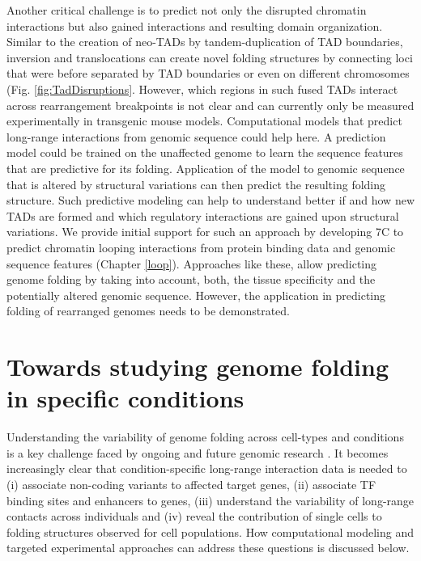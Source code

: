 \documentclass[a4paper,twoside=true,openright,parskip=full,chapterprefix=true,11pt,headings=normal,bibliography=totoc,listof=totoc,titlepage=on,captions=tableabove,draft=false]{scrreprt}
\theoremstyle{definition}
\theoremstyle{definition}
\theoremstyle{definition}
\theoremstyle{remark}
\begin{document}
Another critical challenge is to predict not only the disrupted
chromatin interactions but also gained interactions and resulting domain
organization. Similar to the creation of neo-TADs by tandem-duplication
of TAD boundaries, inversion and translocations can create novel folding
structures by connecting loci that were before separated by TAD
boundaries or even on different chromosomes (Fig.
\ref{fig:TadDisruptions}. However, which regions in such fused TADs
interact across rearrangement breakpoints is not clear and can currently
only be measured experimentally in transgenic mouse models.
Computational models that predict long-range interactions from genomic
sequence could help here. A prediction model could be trained on the
unaffected genome to learn the sequence features that are predictive for
its folding. Application of the model to genomic sequence that is
altered by structural variations can then predict the resulting folding
structure. Such predictive modeling can help to understand better if and
how new TADs are formed and which regulatory interactions are gained
upon structural variations. We provide initial support for such an
approach by developing 7C to predict chromatin looping interactions from
protein binding data and genomic sequence features (Chapter \ref{loop}).
Approaches like these, allow predicting genome folding by taking into
account, both, the tissue specificity and the potentially altered
genomic sequence. However, the application in predicting folding of
rearranged genomes needs to be demonstrated.

\hypertarget{towards-studying-genome-folding-in-specific-conditions}{%
\section{Towards studying genome folding in specific
conditions}\label{towards-studying-genome-folding-in-specific-conditions}}

Understanding the variability of genome folding across cell-types and
conditions is a key challenge faced by ongoing and future genomic
research \citep{Yu2017}. It becomes increasingly clear that
condition-specific long-range interaction data is needed to (i)
associate non-coding variants to affected target genes, (ii) associate
TF binding sites and enhancers to genes, (iii) understand the
variability of long-range contacts across individuals and (iv) reveal
the contribution of single cells to folding structures observed for cell
populations. How computational modeling and targeted experimental
approaches can address these questions is discussed below.
\end{document}
